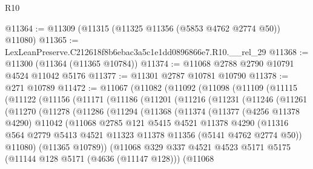 \begin{lexlean}{R10}
\begin{coremodule}
@11364 := @11309 (@11315 (@11325 @11356 (@5853 @4762 @2774 @50)) @11080)
@11365 := LexLeanPreserve.C212618f8b6ebac3a5c1e1dd0896866e7.R10.__rel_29
@11368 := @11300 (@11364 (@11365 @10784))
@11374 := @11068 @2788 @2790 @10791 @4524 @11042 @5176
@11377 := @11301 @2787 @10781 @10790
@11378 := @271 @10789
@11472 := @11067
    (@11082
      (@11092
        (@11098
          (@11109
            (@11115
              (@11122
                (@11156
                  (@11171
                    (@11186
                      (@11201
                        (@11216
                          (@11231
                            (@11246
                              (@11261
                                (@11270
                                  (@11278
                                    (@11286
                                      (@11294
                                        (@11368
                                          (@11374
                                            (@11377
                                              (@4256 @11378 @4290)
                                              @11042
                                              (@11068
                                                @2785
                                                @121
                                                @5415
                                                @4521
                                                @11378
                                                @4290
                                                (@11316
                                                  @564
                                                  @2779
                                                  @5413
                                                  @4521
                                                  @11323
                                                  @11378
                                                  @11356
                                                  (@5141 @4762 @2774 @50))
                                                @11080)
                                              (@11365 @10789))
                                            (@11068
                                              @329
                                              @337
                                              @4521
                                              @4523
                                              @5171
                                              @5175
                                              (@11144 @128 @5171 (@4636 (@11147 @128)))
                                              (@11068

\end{coremodule}
\end{lexlean}
